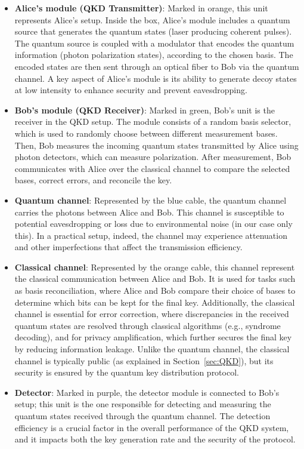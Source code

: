 \documentclass[prl,twocolumn]{revtex4-1}
\begin{document}
\begin{itemize}
    \item \textbf{Alice's module (QKD Transmitter)}: Marked in orange, this unit represents Alice's setup. Inside the box, Alice's module includes a quantum source that generates the quantum states (laser producing coherent pulses). The quantum source is coupled with a modulator that encodes the quantum information (photon polarization states), according to the chosen basis. The encoded states are then sent through an optical fiber to Bob via the quantum channel. A key aspect of Alice's module is its ability to generate decoy states at low intensity to enhance security and prevent eavesdropping. 

    \item \textbf{Bob's module (QKD Receiver)}: Marked in green, Bob's unit is the receiver in the QKD setup. The module consists of a random basis selector, which is used to randomly choose between different measurement bases. Then, Bob measures the incoming quantum states transmitted by Alice using photon detectors, which can measure polarization. After measurement, Bob communicates with Alice over the classical channel to compare the selected bases, correct errors, and reconcile the key.
    
    \item \textbf{Quantum channel}: Represented by the blue cable, the quantum channel carries the photons between Alice and Bob. This channel is susceptible to potential eavesdropping or loss due to environmental noise (in our case only this). In a practical setup, indeed, the channel may experience attenuation and other imperfections that affect the transmission efficiency.

    \item \textbf{Classical channel}: Represented by the orange cable, this channel represent the classical communication between Alice and Bob. It is used for tasks such as basis reconciliation, where Alice and Bob compare their choice of bases to determine which bits can be kept for the final key. Additionally, the classical channel is essential for error correction, where discrepancies in the received quantum states are resolved through classical algorithms (e.g., syndrome decoding), and for privacy amplification, which further secures the final key by reducing information leakage. Unlike the quantum channel, the classical channel is typically public (as explained in Section~\ref{sec:QKD}), but its security is ensured by the quantum key distribution protocol.

    \item \textbf{Detector}: Marked in purple, the detector module is connected to Bob's setup; this unit is the one  responsible for detecting and measuring the quantum states received through the quantum channel. The detection efficiency is a crucial factor in the overall performance of the QKD system, and it impacts both the key generation rate and the security of the protocol.
\end{itemize}
\end{document}
